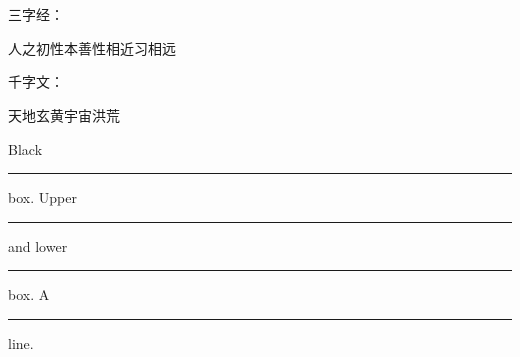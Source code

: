 \documentclass{ctexart}
\begin{document}
\\

\\[1ex]
\setlength{\fboxrule}{1.6pt}
\setlength{\fboxsep}{1em}

三字经：\parbox[t]{3em}%
{人之初性本善性相近习相远}
\quad
千字文：
\begin{minipage}[b][8ex][t]{4em}
天地玄黄宇宙洪荒
\end{minipage}


Black \rule{12pt}{4pt} box.
Upper \rule[4pt]{6pt}{8pt} and
lower \rule[-4pt]{6pt}{8pt} box.
A \rule[-.4pt]{3em}{.4pt} line.
\end{document}
